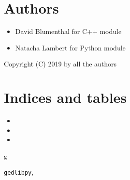 \documentclass[letterpaper,10pt,english]{sphinxmanual}
\begin{document}
\chapter{Authors}
\label{index:authors}\begin{itemize}
\item {} 
David Blumenthal for C++ module

\item {} 
Natacha Lambert for Python module

\end{itemize}

Copyright (C) 2019 by all the authors


\chapter{Indices and tables}
\label{index:indices-and-tables}\begin{itemize}
\item {} 

\item {} 

\item {} 

\end{itemize}


\renewcommand{\indexname}{Python Module Index}
\begin{theindex}
\def\bigletter#1{{\Large\sffamily#1}\nopagebreak\vspace{1mm}}
\bigletter{g}
\item {\texttt{gedlibpy}}, \pageref{doc:module-gedlibpy}
\end{theindex}

\renewcommand{\indexname}{Index}
\printindex
\end{document}
